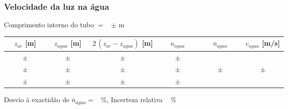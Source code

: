 \documentclass[a4paper,12pt]{article}  %
\begin{document}
\subsubsection{\sf Velocidade da luz na água}\label{sec:dados_vid}

\noindent Comprimento interno do tubo $=$~\underline{\makebox[1cm][r]{~}} $\pm$ \underline{\makebox[1cm][r]{~}} m  

\begin{center}
	\begin{tabular}{|c|c|c|c|c|c|}
	\hline
	 $ z_{ar} $  [m]   & $ z_{agua}$  [m] & $2\,(z_{ar}- z_{agua})$ [m] & $n_{agua}$  & $\overline{n}_{agua}$ & $c_{agua}$ [m/s]\\
	\hline \hline
	 $ \quad\quad \pm \quad\quad $  & $ \quad\quad \pm \quad\quad $  & $ \pm $ & $ \quad\quad \pm \quad\quad $ &  & \\ \cline{1-4}
	  $ \pm $& $ \quad \pm \quad $ & $ \pm $ & $ \quad \pm \quad$ & $ \quad\quad \pm \quad\quad$  & $ \quad\quad \pm \quad\quad$ \\ \cline{1-4}
	  $ \pm $ & $ \quad \pm \quad $ &  $\pm $ & $ \quad \pm \quad $ &  & \\ \hline
			\end{tabular}
\end{center}

\noindent Desvio à exactidão de $\overline{n}_{agua} =$~\underline{\makebox[1cm][r]{~}} \%, 
 Incerteza relativa ~\underline{\makebox[1cm][r]{~}} \%



\end{document}

